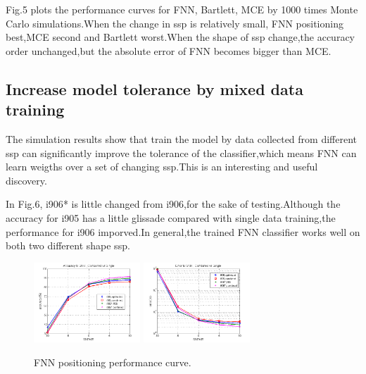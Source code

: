 Fig.5 plots the performance curves for FNN, Bartlett, MCE by 1000 times Monte Carlo simulations.When the change in ssp is relatively small, FNN positioning best,MCE second and Bartlett worst.When the shape of ssp change,the accuracy
order unchanged,but the absolute error of FNN becomes bigger than MCE.


\subsection{%
Increase model tolerance by mixed data training}
The simulation results show that train the model by data collected from different ssp can significantly improve the tolerance of the classifier,which means FNN can learn weigths over a set of changing ssp.This is an interesting and useful discovery.


In Fig.6, i906{*} is little changed from i906,for the sake of testing.Although the accuracy for i905 has a little glissade compared with single data training,the performance for i906 imporved.In general,the trained FNN classifier works well on both two different shape ssp.

\begin{figure}
\includegraphics[width=4cm,height=3cm]{figure/Accuracy_to_SNR_Combined_vs_Single}
\includegraphics[width=4cm,height=3cm]{figure/Error_to_SNR_Combined_vs_Single}
\caption{FNN positioning performance curve.}
\end{figure}

